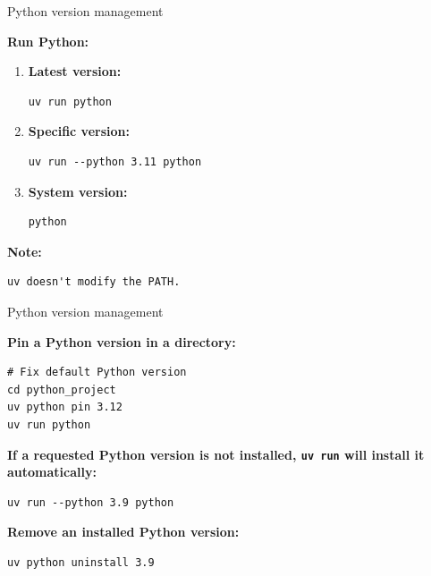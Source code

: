\documentclass[aspectratio=169,xcolor=dvipsnames,svgnames,x11names,fleqn]{beamer}
\begin{document}
\begin{frame}[containsverbatim]{Python version management}

\textbf{Run Python:}
\begin{enumerate}
    \item \textbf{Latest version:}
    \begin{verbatim}
uv run python
\end{verbatim}
\item \textbf{Specific version:}
\begin{verbatim}
uv run --python 3.11 python
\end{verbatim}
\item \textbf{System version:}
\begin{verbatim}
python
\end{verbatim}
\end{enumerate}

\bigskip
\textbf{Note:}
\begin{verbatim}
uv doesn't modify the PATH.
\end{verbatim}

\end{frame}

\begin{frame}[containsverbatim]{Python version management}

    \textbf{Pin a Python version in a directory:}
    \begin{verbatim}
# Fix default Python version
cd python_project
uv python pin 3.12
uv run python
    \end{verbatim}

    \bigskip
    \textbf{If a requested Python version is not installed, \texttt{uv run} will install it automatically:}
    \begin{verbatim}
uv run --python 3.9 python
    \end{verbatim}

    \bigskip
    \textbf{Remove an installed Python version:}
    \begin{verbatim}
uv python uninstall 3.9
    \end{verbatim}

\end{frame}
\end{document}
